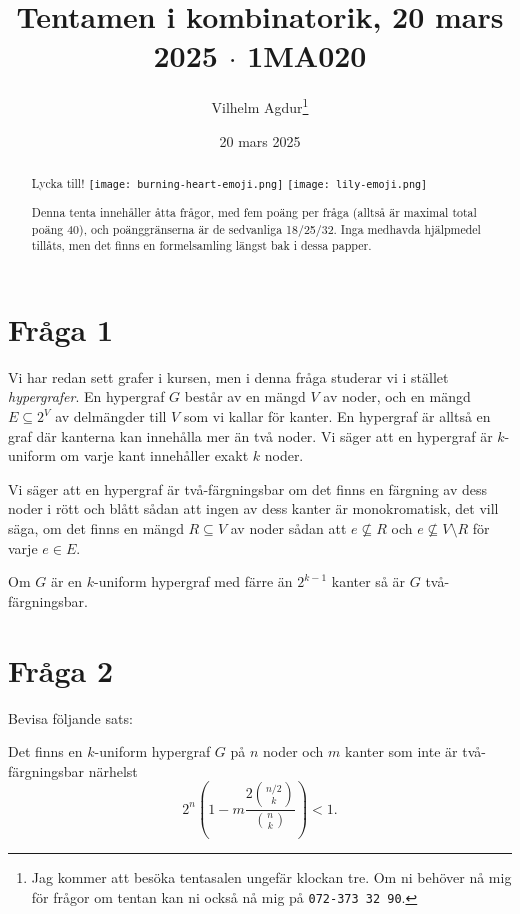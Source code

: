 \documentclass[nobib]{tufte-handout}
\title{Tentamen i kombinatorik, 20 mars 2025 $\cdot$ 1MA020}
\author[Vilhelm Agdur]{Vilhelm Agdur\thanks{Jag kommer att besöka tentasalen ungefär klockan tre. Om ni behöver nå mig för frågor om tentan kan ni också nå mig på \texttt{072-373 32 90}.}}
\date{20 mars 2025}
\begin{document}

\maketitle%

\begin{abstract}
\noindent
Lycka till! {\vspace{0.1cm}\texttt{[image: burning-heart-emoji.png]} \texttt{[image: lily-emoji.png]}}

Denna tenta innehåller åtta frågor, med fem poäng per fråga (alltså är maximal total poäng 40), och poänggränserna är de sedvanliga 18/25/32. Inga medhavda hjälpmedel tillåts, men det finns en formelsamling längst bak i dessa papper.
\end{abstract}

\section{Fråga 1} %
Vi har redan sett grafer i kursen, men i denna fråga studerar vi i stället \emph{hypergrafer}. En hypergraf $G$ består av en mängd $V$ av noder, och en mängd $E \subseteq 2^V$ av delmängder till $V$ som vi kallar för kanter. En hypergraf är alltså en graf där kanterna kan innehålla mer än två noder. Vi säger att en hypergraf är $k$-uniform om varje kant innehåller exakt $k$ noder.

Vi säger att en hypergraf är två-färgningsbar om det finns en färgning av dess noder i rött och blått sådan att ingen av dess kanter är monokromatisk, det vill säga, om det finns en mängd $R \subseteq V$ av noder sådan att $e \not\subseteq R$ och $e \not\subseteq V \setminus R$ för varje $e \in E$.

\begin{theorem}[Erd\H{o}s, 1963]
  Om $G$ är en $k$-uniform hypergraf med färre än $2^{k-1}$ kanter så är $G$ två-färgningsbar.
\end{theorem}

\section{Fråga 2} %
Bevisa följande sats:

\begin{theorem}[Erd\H{o}s, 1964]
  Det finns en $k$-uniform hypergraf $G$ på $n$ noder och $m$ kanter som inte är två-färgningsbar närhelst
  $$2^n\left(1 - m\frac{2\binom{n/2}{k}}{\binom{n}{k}}\right) < 1.$$
\end{theorem}
\end{document}
